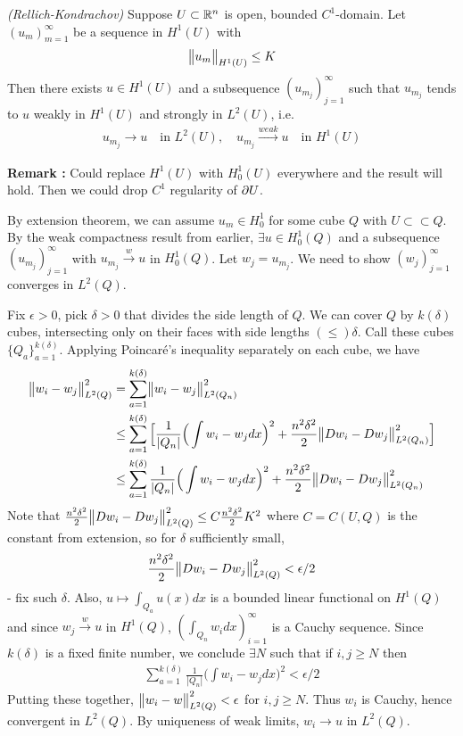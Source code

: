 \documentclass[12pt,a4paper]{report}
\newenvironment{proof}
{\begin{changemargin}{1cm}{0.5cm} 
	}%
	{\end{changemargin}
}
\begin{document}
\thm \emph{(Rellich-Kondrachov)} Suppose $U \subset \mathbb{R}^n$ is open, bounded $C^1$-domain. Let $(u_m)_{m=1}^{\infty}$ be a sequence in $H^1(U)$ with
\begin{align*}
\bigl\lVert u_m\bigr\rVert_{H^1(U)} \leq K
\end{align*}
Then there exists $u\in H^1(U)$ and a subsequence $(u_{m_j})_{j=1}^{\infty}$ such that $u_{m_j}$ tends to $u$ weakly in $H^1(U)$ and strongly in $L^2(U)$, i.e.
\begin{align*}
u_{m_j} \rightarrow u \quad \text{in } L^2(U), \quad u_{m_j} \xrightarrow{weak} u \quad \text{in } H^1(U)
\end{align*}

\textbf{Remark :} Could replace $H^1(U)$ with $H_0^1(U)$ everywhere and the result will hold. Then we could drop $C^1$ regularity of $\partial U$. 
\begin{proof}
\pf By extension theorem, we can assume $u_m \in H_0^1$ for some cube $Q$ with $U \subset \subset Q$. By the weak compactness result from earlier, $\exists u\in H_0^1(Q)$ and a subsequence $(u_{m_j})_{j=1}^{\infty}$ with $u_{m_j} \xrightarrow{w} u$ in $H_0^1(Q)$. Let $w_j = u_{m_j}$. We need to show $(w_j)_{j=1}^{\infty}$ converges in $L^2(Q)$.

\quad Fix $\epsilon >0$, pick $\delta >0$ that divides the side length of $Q$. We can cover $Q$ by $k(\delta)$ cubes, intersecting only on their faces with side lengths $(\leq)\delta$. Call these cubes $\{Q_a \}_{a=1}^{k(\delta)}$. Applying Poincar\'{e}'s inequality separately on each cube, we have
\begin{align*}
\bigl\lVert w_i - w_j\bigr\rVert_{L^2(Q)}^2 &= \sum_{a=1}^{k(\delta)} \bigl\lVert w_i -w_j\bigr\rVert_{L^2(Q_n)}^2 \\
& \leq  \sum_{a=1}^{k(\delta)} \Big[ \frac{1}{|Q_n|} \Big( \int w_i - w_j dx\Big)^2 + \frac{n^2 \delta^2}{2} \bigl\lVert Dw_i -Dw_j\bigr\rVert_{L^2(Q_n)}^2\Big] \\
& \leq \sum_{a=1}^{k(\delta)} \frac{1}{|Q_n|} \Big( \int w_i - w_j dx\Big)^2 + \frac{n^2 \delta^2}{2} \bigl\lVert Dw_i -Dw_j\bigr\rVert_{L^2(Q_n)}^2
\end{align*}
Note that $\frac{n^2 \delta^2}{2} \bigl\lVert Dw_i - Dw_j\bigr\rVert_{L^2(Q)}^2 \leq C \frac{n^2\delta^2}{2} K^2$ where $C = C(U,Q)$ is the constant from extension, so for $\delta$ sufficiently small, 
\begin{align*}
\frac{n^2 \delta^2}{2}\bigl\lVert Dw_i - Dw_j\bigr\rVert_{L^2(Q)}^2 < \epsilon/2
\end{align*}
- fix such $\delta$. Also, $u \mapsto \int_{Q_a} u(x)dx$ is a bounded linear functional on $H^1(Q)$ and since $w_j \xrightarrow{w} u$ in $H^1(Q)$, $(\int_{Q_n} w_i dx)_{i=1}^{\infty}$ is a Cauchy sequence. Since $k(\delta)$ is a fixed finite number, we conclude $\exists N$ such that if $i,j\geq N$ then
\begin{align*}
\sum_{a=1}^{k(\delta)} \frac{1}{|Q_n|} \Big( \int w_i - w_j dx\Big)^2 < \epsilon/2
\end{align*}
Putting these together, $\bigl\lVert w_i -w\bigr\rVert_{L^2(Q)}^2 < \epsilon$ for $i,j\geq N$. Thus $w_i$ is Cauchy, hence convergent in $L^2(Q)$. By uniqueness of weak limits, $w_i \rightarrow u$ in $L^2(Q)$.

\eop
\end{proof}
\s
\end{document}

